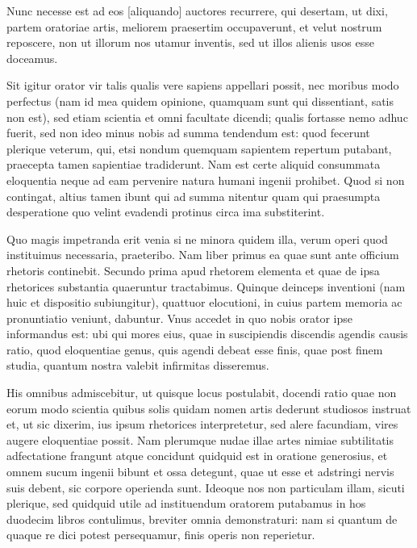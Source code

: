 Nunc necesse est ad eos [aliquando] auctores recurrere, qui desertam, ut dixi, partem oratoriae artis, meliorem praesertim occupaverunt, et velut nostrum reposcere, non ut illorum nos utamur inventis, sed ut illos alienis usos esse doceamus. 

Sit igitur orator vir talis qualis vere sapiens appellari possit, nec moribus modo perfectus (nam id mea quidem opinione, quamquam sunt qui dissentiant, satis non est), sed etiam scientia et omni facultate dicendi; qualis fortasse nemo adhuc fuerit, sed non ideo minus nobis ad summa tendendum est: quod fecerunt plerique veterum, qui, etsi nondum quemquam sapientem repertum putabant, praecepta tamen sapientiae tradiderunt. Nam est certe aliquid consummata eloquentia neque ad eam pervenire natura humani ingenii prohibet. Quod si non contingat, altius tamen ibunt qui ad summa nitentur quam qui praesumpta desperatione quo velint evadendi protinus circa ima substiterint. 

Quo magis impetranda erit venia si ne minora quidem illa, verum operi quod instituimus necessaria, praeteribo. Nam liber primus ea quae sunt ante officium rhetoris continebit. Secundo prima apud rhetorem elementa et quae de ipsa rhetorices substantia quaeruntur tractabimus. Quinque deinceps inventioni (nam huic et dispositio subiungitur), quattuor elocutioni, in cuius partem memoria ac pronuntiatio veniunt, dabuntur. Vnus accedet in quo nobis orator ipse informandus est: ubi qui mores eius, quae in suscipiendis discendis agendis causis ratio, quod eloquentiae genus, quis agendi debeat esse finis, quae post finem studia, quantum nostra valebit infirmitas disseremus. 

His omnibus admiscebitur, ut quisque locus postulabit, docendi ratio quae non eorum modo scientia quibus solis quidam nomen artis dederunt studiosos instruat et, ut sic dixerim, ius ipsum rhetorices interpretetur, sed alere facundiam, vires augere eloquentiae possit. Nam plerumque nudae illae artes nimiae subtilitatis adfectatione frangunt atque concidunt quidquid est in oratione generosius, et omnem sucum ingenii bibunt et ossa detegunt, quae ut esse et adstringi nervis suis debent, sic corpore operienda sunt. Ideoque nos non particulam illam, sicuti plerique, sed quidquid utile ad instituendum oratorem putabamus in hos duodecim libros contulimus, breviter omnia demonstraturi: nam si quantum de quaque re dici potest persequamur, finis operis non reperietur.
